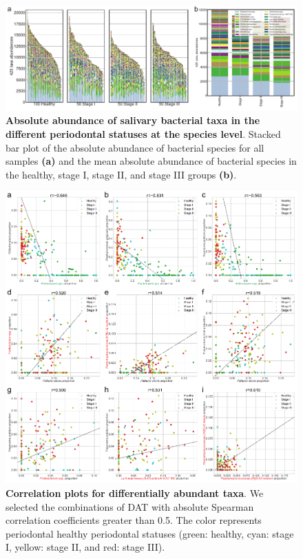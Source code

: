 \documentclass[11pt, a4paper, onecolumn, oneside]{report}
\begin{document}
            \begin{figure}[p]
                \centering
                \includegraphics[width=15 cm]{Figures/Periodontitis/Figure_S2.pdf}
                \caption[Absolute abundance of salivary bacterial taxa in the different periodontal statuses at the species level]{\textbf{Absolute abundance of salivary bacterial taxa in the different periodontal statuses at the species level}. Stacked bar plot of the absolute abundance of bacterial species for all samples \textbf{(a)} and the mean absolute abundance of bacterial species in the healthy, stage I, stage II, and stage III groups \textbf{(b)}.}
                \label{fig:Periodontitis-abundance}
            \end{figure}
            \clearpage

            \begin{figure}[p]
                \centering
                \includegraphics[width=12 cm]{Figures/Periodontitis/Figure_S3.pdf}
                \caption[Correlation plots for differentially abundant taxa]{\textbf{Correlation plots for differentially abundant taxa}. We selected the combinations of DAT with absolute Spearman correlation coefficients greater than 0.5. The color represents periodontal healthy periodontal statuses (green: healthy, cyan: stage I, yellow: stage II, and red: stage III).}
                \label{fig:Periodontitis-correlation2}
            \end{figure}
            \clearpage
        \newpage
\end{document}
